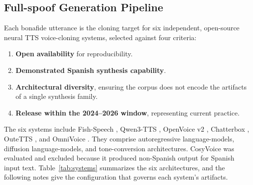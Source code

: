 \documentclass[11pt]{article}
\begin{document}
\FloatBarrier
\subsection*{Full-spoof Generation Pipeline}

Each bonafide utterance is the cloning target for six independent,
open-source neural TTS voice-cloning systems, selected against four
criteria:
\begin{enumerate}
  \item \textbf{Open availability} for reproducibility.
  \item \textbf{Demonstrated Spanish synthesis capability}.
  \item \textbf{Architectural diversity}, ensuring the corpus does not
  encode the artifacts of a single synthesis family.
  \item \textbf{Release within the 2024--2026 window}, representing
  current practice.
\end{enumerate}
The six systems include Fish-Speech \citep{fishspeech}, Qwen3-TTS
\citep{qwen3tts}, OpenVoice v2 \citep{openvoice}, Chatterbox
\citep{chatterbox}, OuteTTS \citep{outetts}, and OmniVoice
\citep{omnivoice}. They comprise autoregressive language-models, diffusion
language-models, and tone-conversion architectures. CosyVoice
\citep{cosyvoice} was evaluated and excluded because it produced
non-Spanish output for Spanish input text.
%
Table~\ref{tab:systems} summarizes the six architectures, and the
following notes give the configuration that governs each system's
artifacts.
\end{document}
